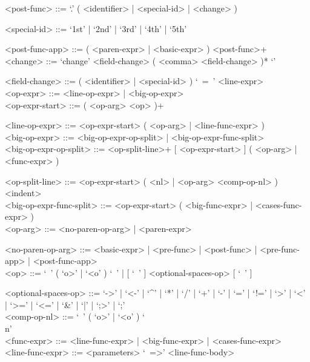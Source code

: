 \documentclass{article}
\begin{document}
\begin{grammar}
<post-func> ::= `.' ( <identifier> | <special-id> | <change> )

<special-id> ::= `1st' | `2nd' | `3rd' | `4th' | `5th'

<post-func-app> ::= ( <paren-expr> | <basic-expr> ) <post-func>+
\\

<change> ::= `change{' <field-change> ( <comma> <field-change> )* `}'

<field-change> ::= ( <identifier> | <special-id> ) `\ =\ ' <line-expr>
\\

<op-expr> ::= <line-op-expr> | <big-op-expr>
\\

<op-expr-start> ::= ( <op-arg> <op> )+

<line-op-expr> ::= <op-expr-start> ( <op-arg> | <line-func-expr> )
\\

<big-op-expr> ::= 
<big-op-expr-op-split> | <big-op-expr-func-split>
\\

<big-op-expr-op-split> ::= 
<op-split-line>+ [ <op-expr-start> ] ( <op-arg> | <func-expr> )

<op-split-line> ::=
<op-expr-start> ( <nl> | <op-arg> <comp-op-nl> ) <indent> 
\\

<big-op-expr-func-split> ::= <op-expr-start> ( <big-func-expr> | <cases-func-expr> )
\\

<op-arg> ::= <no-paren-op-arg> | <paren-expr>

<no-paren-op-arg> ::=
<basic-expr> | <pre-func> | <post-func> | <pre-func-app> | <post-func-app>
\\

<op> ::=  
`\ ' ( `o>' | `<o' ) `\ ' | [ `\ ' ] <optional-spaces-op> [ `\ ' ]

<optional-spaces-op> ::= 
`->' | `<-' | `^' | `*' | `/' | `+' | `-' | `=' | `!=' | `>' | `<' | `>=' | `<=' |
`\&' | `|' | `;>' | `;'
\\

<comp-op-nl> ::= `\ ' ( `o>' | `<o' ) `\\n'
\\

<func-expr> ::= <line-func-expr> | <big-func-expr> | <cases-func-expr>
\\

<line-func-expr> ::= <parameters> `\ =>' <line-func-body>


\end{grammar}
\end{document}
